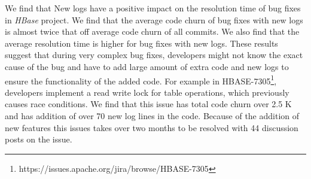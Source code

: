 We find that New logs have a positive impact on the resolution time of bug fixes in \emph{HBase} project. We find that the average code churn of bug fixes with new logs is almost twice that off average code churn of all commits. We also find that the average resolution time is higher for bug fixes with new logs. These results suggest that during very complex bug fixes, developers might not know the exact cause of the bug and have to add large amount of extra code and new logs to ensure the functionality of the added code. For example  in HBASE-7305\footnote{https://issues.apache.org/jira/browse/HBASE-7305}, developers implement a read write lock for table operations, which previously causes race conditions. We find that this issue has total code churn over 2.5 K and has addition of over 70 new log lines in the code. Because of the addition of new features this issues takes over two months to be resolved with 44 discussion posts on the issue. 



